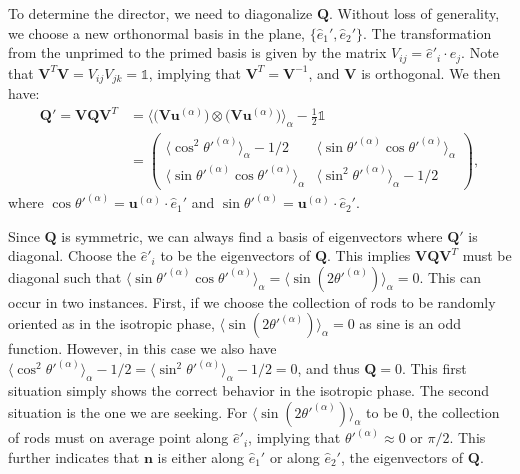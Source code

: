 To determine the director, we need to diagonalize $\mathbf{Q}$.
Without loss of generality, we choose a new orthonormal basis in the plane, $\{ \hat{e}_1', \hat{e}_2' \}$.
The transformation from the unprimed to the primed basis is given by the matrix $V_{ij} = \hat{e}'_i \cdot \hat{e}_j$.
Note that $\mathbf{V}^T \mathbf{V} = V_{ij}V_{jk} =  \mathbb{1}$, implying that $\mathbf{V}^T = \mathbf{V}^{-1}$, and $\mathbf{V}$ is orthogonal.
We then have:
\begin{align}
  \mathbf{Q}' = \mathbf{V} \mathbf{Q} \mathbf{V}^T &=
  \bigg \langle \big ( \mathbf{V} \mathbf{u}^{(\alpha)} \big ) \otimes \big ( \mathbf{V} \mathbf{u}^{(\alpha)} \big )\bigg \rangle_{\alpha}  - \frac{1}{2} \mathbb{1} \nonumber \\ & =
  \begin{pmatrix}
    \langle \cos^2 \theta'^{(\alpha)}\rangle_{\alpha} - 1/2 & \langle \sin \theta'^{(\alpha)} \cos \theta'^{(\alpha)} \rangle_{\alpha} \\
    \langle \sin \theta'^{(\alpha)} \cos \theta'^{(\alpha)} \rangle_{\alpha} & \langle \sin^2 \theta'^{(\alpha)} \rangle_{\alpha} - 1/2
  \end{pmatrix},\label{e:2-2DOrderRot}
\end{align}
where $\cos \theta'^{(\alpha)} = \mathbf{u}^{(\alpha)} \cdot \hat{e}_1'$ and $\sin \theta'^{(\alpha)} = \mathbf{u}^{(\alpha)} \cdot \hat{e}_2'$.

Since $\mathbf{Q}$ is symmetric, we can always find a basis of eigenvectors where $\mathbf{Q}'$ is diagonal.
Choose the $\hat{e}'_i$ to be the eigenvectors of $\mathbf{Q}$.
This implies $ \mathbf{V} \mathbf{Q} \mathbf{V}^T$ must be diagonal such that $\langle \sin \theta'^{(\alpha)} \cos \theta'^{(\alpha)} \rangle_{\alpha} = \langle \sin (2 \theta'^{(\alpha)}) \rangle_{\alpha} = 0$.
This can occur in two instances.
First, if we choose the collection of rods to be randomly oriented as in the isotropic phase, $\langle \sin (2 \theta'^{(\alpha)}) \rangle_{\alpha} = 0$ as sine is an odd function.
However, in this case we also have $\langle \cos^2 \theta'^{(\alpha)}\rangle_{\alpha} - 1/2 = \langle \sin^2 \theta'^{(\alpha)}\rangle_{\alpha} - 1/2 = 0$, and thus $\mathbf{Q} = 0$.
This first situation simply shows the correct behavior in the isotropic phase.
The second situation is the one we are seeking.
For $\langle \sin (2 \theta'^{(\alpha)}) \rangle_{\alpha}$ to be $0$, the collection of rods must on average point along $\hat{e}'_i$, implying that $\theta'^{(\alpha)} \approx 0 \textrm{ or } \pi/2$.
This further indicates that $\mathbf{n}$ is either along $\hat{e}_1'$ or along $\hat{e}_2'$, the eigenvectors of $\mathbf{Q}$.

